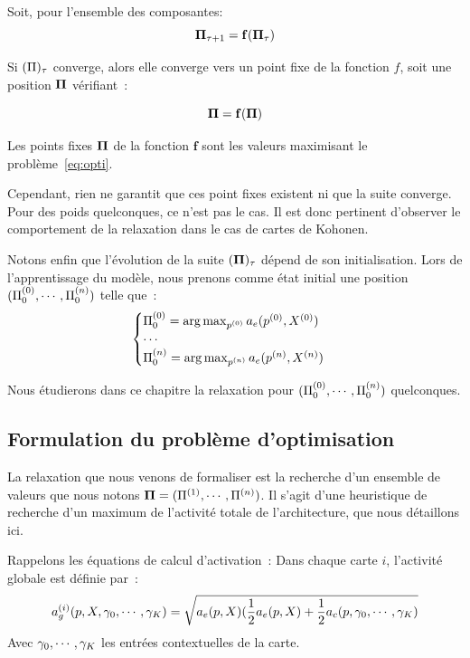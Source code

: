 \documentclass[../main]{subfiles}
\begin{document}
Soit, pour l'ensemble des composantes: 
\begin{equation}
\mathbf{\Pi}_{\tau+1} = \mathbf{f}(\mathbf{\Pi}_\tau)
\end{equation}

Si $(\Pi)_\tau$ converge, alors elle converge vers un point fixe de la fonction $f$, soit une position $\mathbf{\Pi}$ vérifiant~:

\begin{equation}
\mathbf{\Pi} = \mathbf{f}(\mathbf{\Pi})
\label{eq:suite}
\end{equation}

Les points fixes $\mathbf{\Pi}$ de la fonction $\mathbf{f}$ sont les valeurs maximisant le problème~\ref{eq:opti}.

Cependant, rien ne garantit que ces point fixes existent ni que la suite converge.
Pour des poids quelconques, ce n'est pas le cas. Il est donc pertinent d'observer le comportement de la relaxation dans le cas de cartes de Kohonen.

Notons enfin que l'évolution de la suite $(\mathbf{\Pi})_{\tau}$ dépend de son initialisation.
Lors de l'apprentissage du modèle, nous prenons comme état initial une position $(\Pi^{({0})}_0, \cdots , \Pi^{({n})}_0)$  telle que~: 
\begin{equation}
\begin{cases}
\Pi^{({0})}_0 = \operatorname*{arg\,max}_{p^{({0})}} a_e(p^{({0})},X^{({0})})\\
\cdots \\
\Pi^{({n})}_0 = \operatorname*{arg\,max}_{p^{({n})}} a_e(p^{({n})},X^{({n})})\\
\end{cases}
\label{eq:init}
\end{equation}

Nous étudierons dans ce chapitre la relaxation pour $(\Pi^{({0})}_0, \cdots , \Pi^{({n})}_0)$ quelconques.

\subsection{Formulation du problème d'optimisation}

La relaxation que nous venons de formaliser est la recherche d'un ensemble de valeurs que nous notons $\mathbf{\Pi} = (\Pi^{({1})}, \cdots, \Pi^{({n})})$.
Il s'agit d'une heuristique de recherche d'un maximum de l'activité totale de l'architecture, que nous détaillons ici.

Rappelons les équations de calcul d'activation~:
Dans chaque carte $i$, l'activité globale est définie par~:
\begin{equation}\label{eq:ag}
	a_g^{({i})}(p, X, \gamma_0, \cdots, \gamma_K) = \sqrt{a_e(p,X)(\frac{1}{2}a_e(p,X) + \frac{1}{2}a_c(p,\gamma_0, \cdots, \gamma_K)}
\end{equation}
Avec $\gamma_0, \cdots, \gamma_K$ les entrées contextuelles de la carte.
\end{document}
